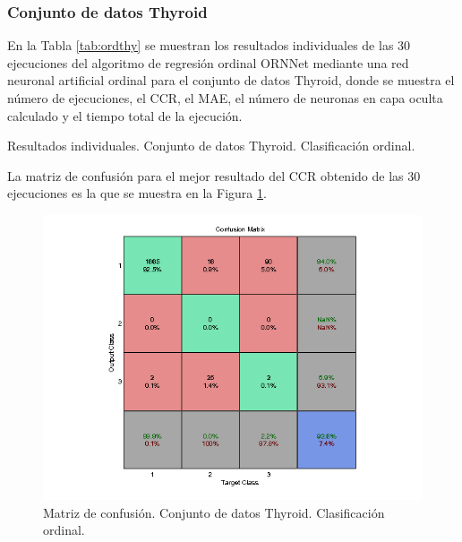 			\subsubsection{Conjunto de datos Thyroid}
			
			En la Tabla \ref{tab:ordthy} se muestran los resultados individuales de las 30 ejecuciones del algoritmo de regresión ordinal ORNNet mediante una red neuronal artificial ordinal para el conjunto de datos Thyroid, donde se muestra el número de ejecuciones, el CCR, el MAE, el número de neuronas en capa oculta calculado y el tiempo total de la ejecución.\\
			
			\begin{table}[!htbp]
				\centering
				\caption{Resultados individuales. Conjunto de datos Thyroid. Clasificación ordinal.}
				\label{tab:ordthy}
			\end{table}
			
			La matriz de confusión para el mejor resultado del CCR obtenido de las 30 ejecuciones es la que se muestra en la Figura \ref{fig:ordthy}.
			
			\begin{figure}[htbp]
				\centering
				\includegraphics[scale=0.8]{../src/results/ordinal/thyroid_mc1.png}
				\caption{Matriz de confusión. Conjunto de datos Thyroid. Clasificación ordinal.}
				\label{fig:ordthy}
			\end{figure}
			
